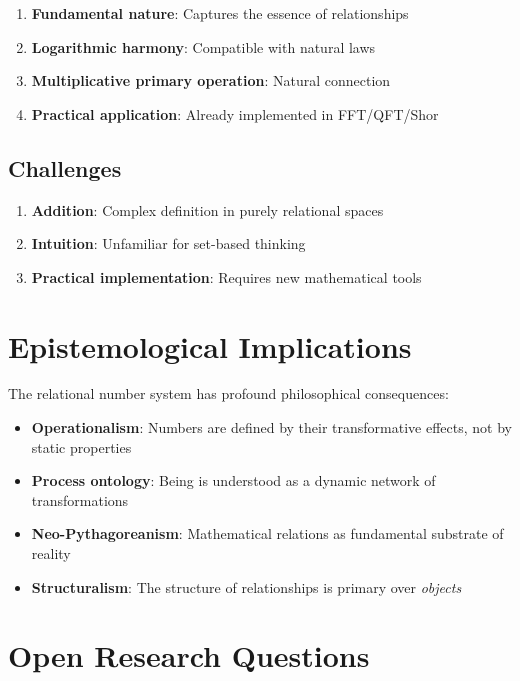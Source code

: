 	\begin{enumerate}
		\item \textbf{Fundamental nature}: Captures the essence of relationships
		\item \textbf{Logarithmic harmony}: Compatible with natural laws
		\item \textbf{Multiplicative primary operation}: Natural connection
		\item \textbf{Practical application}: Already implemented in FFT/QFT/Shor
	\end{enumerate}
	
	\subsection{Challenges}
	
	\begin{enumerate}
		\item \textbf{Addition}: Complex definition in purely relational spaces
		\item \textbf{Intuition}: Unfamiliar for set-based thinking
		\item \textbf{Practical implementation}: Requires new mathematical tools
	\end{enumerate}
	
	\section{Epistemological Implications}
	
	The relational number system has profound philosophical consequences:
	
	\begin{itemize}
		\item \textbf{Operationalism}: Numbers are defined by their transformative effects, not by static properties
		\item \textbf{Process ontology}: Being is understood as a dynamic network of transformations
		\item \textbf{Neo-Pythagoreanism}: Mathematical relations as fundamental substrate of reality
		\item \textbf{Structuralism}: The structure of relationships is primary over \emph{objects}
	\end{itemize}
	
	\section{Open Research Questions}
	

